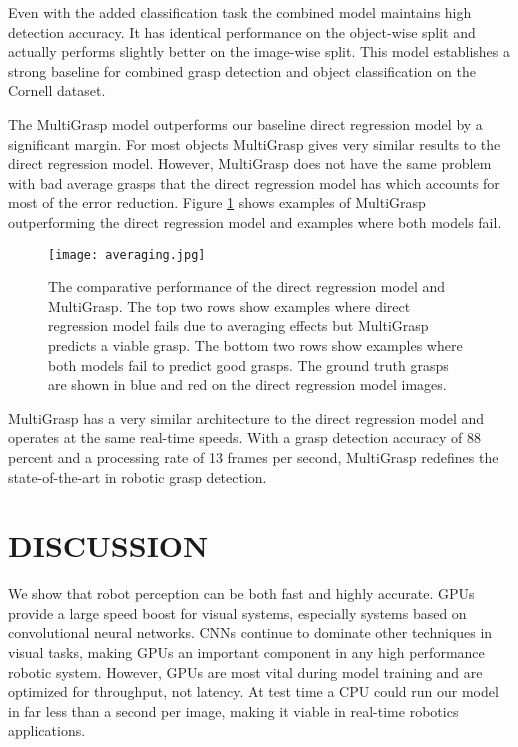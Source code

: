 \documentclass[letterpaper, 10 pt, conference]{ieeeconf}
\begin{document}
Even with the added classification task the combined model maintains high detection accuracy. It has identical performance on the object-wise split and actually performs slightly better on the image-wise split. This model establishes a strong baseline for combined grasp detection and object classification on the Cornell dataset.

The MultiGrasp model outperforms our baseline direct regression model by a significant margin. For most objects MultiGrasp gives very similar results to the direct regression model. However, MultiGrasp does not have the same problem with bad average grasps that the direct regression model has which accounts for most of the error reduction. Figure \ref{averaging} shows examples of MultiGrasp outperforming the direct regression model and examples where both models fail.

   \begin{figure}[tbhp]
      \centering
        \texttt{[image: averaging.jpg]}
      \caption{The comparative performance of the direct regression model and MultiGrasp. The top two rows show examples where direct regression model fails due to averaging effects but MultiGrasp predicts a viable grasp. The bottom two rows show examples where both models fail to predict good grasps. The ground truth grasps are shown in blue and red on the direct regression model images.}
      \label{averaging}
   \end{figure}

MultiGrasp has a very similar architecture to the direct regression model and operates at the same real-time speeds. With a grasp detection accuracy of 88 percent and a processing rate of 13 frames per second, MultiGrasp redefines the state-of-the-art in robotic grasp detection.

\section{DISCUSSION}

\addtolength{\textheight}{-3cm}   

We show that robot perception can be both fast and highly accurate. GPUs provide a large speed boost for visual systems, especially systems based on convolutional neural networks. CNNs continue to dominate other techniques in visual tasks, making GPUs an important component in any high performance robotic system. However, GPUs are most vital during model training and are optimized for throughput, not latency. At test time a CPU could run our model in far less than a second per image, making it viable in real-time robotics applications.
\end{document}
